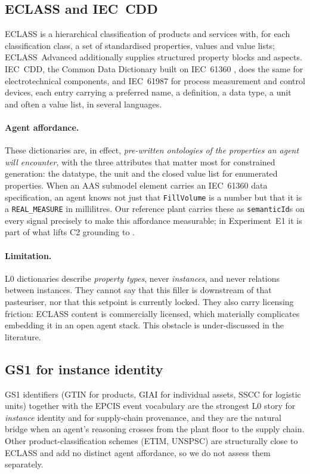 \subsection{ECLASS and IEC~CDD}

ECLASS \cite{eclass} is a hierarchical classification of products and services
with, for each classification class, a set of standardised properties, values
and value lists; ECLASS~Advanced additionally supplies structured property
blocks and aspects. IEC~CDD, the Common Data Dictionary built on IEC~61360
\cite{iec61360}, does the same for electrotechnical components, and IEC~61987
\cite{iec61987} for process measurement and control devices, each entry carrying
a preferred name, a definition, a data type, a unit and often a value list, in
several languages.

\paragraph{Agent affordance.} These dictionaries are, in effect,
\emph{pre-written ontologies of the properties an agent will encounter}, with
the three attributes that matter most for constrained generation: the datatype,
the unit and the closed value list for enumerated properties. When an
AAS submodel element carries an IEC~61360 data specification, an agent knows not
just that \texttt{FillVolume} is a number but that it is a
\texttt{REAL\_MEASURE} in millilitres. Our reference plant carries these as
\texttt{semanticId}s on every signal precisely to make this affordance
measurable; in Experiment~E1 it is part of what lifts C2 grounding to
\GrndTopOneCTwo{}.

\paragraph{Limitation.} L0 dictionaries describe \emph{property types}, never
\emph{instances}, and never relations between instances. They cannot say that
this filler is downstream of that pasteuriser, nor that this setpoint is
currently locked. They also carry licensing friction: ECLASS content is
commercially licensed, which materially complicates embedding it in an
open agent stack. This obstacle is under-discussed in the literature.

\subsection{GS1 for instance identity}

GS1 identifiers (GTIN for products, GIAI for individual assets, SSCC for
logistic units) together with the EPCIS event vocabulary are the strongest L0
story for \emph{instance} identity and for supply-chain provenance, and they are
the natural bridge when an agent's reasoning crosses from the plant floor to the
supply chain. Other product-classification schemes (ETIM, UNSPSC) are
structurally close to ECLASS and add no distinct agent affordance, so we do not
assess them separately.

